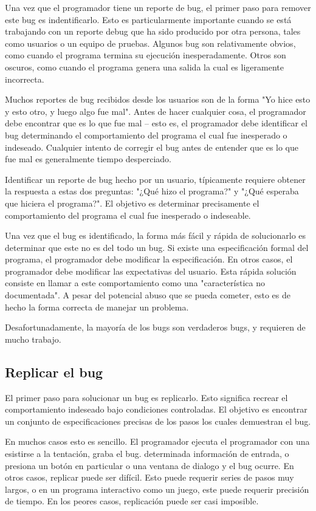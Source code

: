 \documentclass[12pt,legalpaper]{report}
\begin{document}
Una vez que el programador tiene un reporte de bug, el primer paso para remover este bug es indentificarlo.  Esto es particularmente importante cuando se está trabajando con un reporte debug que ha sido producido por otra persona, tales como usuarios o un equipo de pruebas.  Algunos bug son relativamente obvios, como cuando el programa termina su ejecución inesperadamente.  Otros son oscuros, como cuando el programa genera una salida la cual es ligeramente incorrecta.

Muchos reportes de bug recibidos desde los usuarios son de la forma "Yo hice esto y esto otro, y luego algo fue mal".  Antes de hacer cualquier cosa, el programador debe encontrar que es lo que fue mal -- esto es, el programador debe identificar el bug determinando el comportamiento del programa el cual fue inesperado o indeseado.  Cualquier intento de corregir el bug antes de entender que es lo que fue mal es generalmente tiempo desperciado.

Identificar un reporte de bug hecho por un usuario, típicamente requiere obtener la respuesta a estas dos preguntas: "¿Qué hizo el programa?" y "¿Qué esperaba que hiciera el programa?".  El objetivo es determinar precisamente el comportamiento del programa el cual fue inesperado o indeseable.

Una vez que el bug es identificado, la forma más fácil y rápida de solucionarlo es determinar que este no es del todo un bug.  Si existe una especificación formal del programa, el programador debe modificar la especificación.  En otros casos, el programador debe modificar las expectativas del usuario.  Esta rápida solución consiste en llamar a este comportamiento como una "característica no documentada".  A pesar del potencial abuso que se pueda cometer,  esto es de hecho la forma correcta de manejar un problema.

Desafortunadamente, la mayoría de los bugs son verdaderos bugs, y requieren de mucho trabajo.


\subsection{Replicar el bug}

El primer paso para solucionar un bug es replicarlo.  Esto significa recrear el comportamiento indeseado bajo condiciones controladas.  El objetivo es encontrar un conjunto de especificaciones precisas de los pasos los cuales demuestran el bug.


En muchos casos esto es sencillo.  El programador ejecuta el programador con una esistirse a la tentación, graba el bug.  determinada información de entrada, o presiona un botón en particular o una ventana de dialogo y el bug ocurre.  En otros casos, replicar puede ser difícil.  Esto puede requerir series de pasos muy largos, o en un programa interactivo como un juego, este puede requerir precisión de tiempo.  En los peores casos, replicación puede ser casi imposible.
\end{document}
